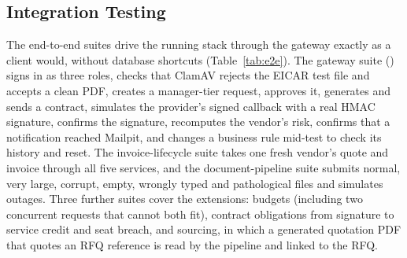 \subsection{Integration Testing}
The end-to-end suites drive the running stack through the gateway exactly as a client would, without database shortcuts (Table~\ref{tab:e2e}). The gateway suite () signs in as three roles, checks that ClamAV rejects the EICAR test file and accepts a clean PDF, creates a manager-tier request, approves it, generates and sends a contract, simulates the provider's signed callback with a real HMAC signature, confirms the signature, recomputes the vendor's risk, confirms that a notification reached Mailpit, and changes a business rule mid-test to check its history and reset. The invoice-lifecycle suite takes one fresh vendor's quote and invoice through all five services, and the document-pipeline suite submits normal, very large, corrupt, empty, wrongly typed and pathological files and simulates outages. Three further suites cover the extensions: budgets (including two concurrent requests that cannot both fit), contract obligations from signature to service credit and seat breach, and sourcing, in which a generated quotation PDF that quotes an RFQ reference is read by the pipeline and linked to the RFQ.

